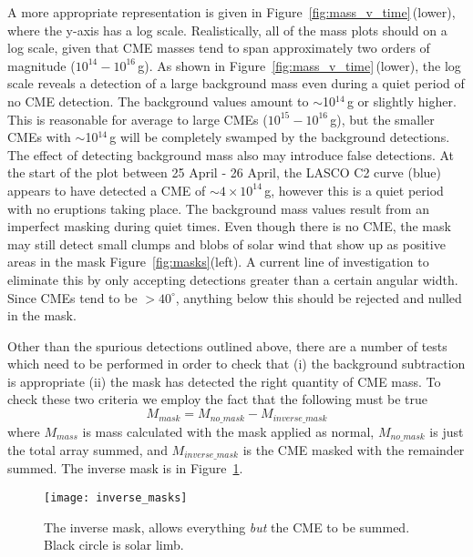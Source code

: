 A more appropriate representation is given in Figure~\ref{fig:mass_v_time}\,(lower), where the y-axis has a log scale. Realistically, all of the mass plots should on a log scale, given that CME masses tend to span approximately two orders of magnitude ($10^{14}-10^{16}$\,g). As shown in Figure~\ref{fig:mass_v_time}\,(lower), the log scale reveals a detection of a large background mass even during a quiet period of no CME detection. The background values amount to $\sim$10$^{14}$\,g or slightly higher. This is reasonable for average to large CMEs ($10^{15}-10^{16}$\,g), but the smaller CMEs with $\sim$10$^{14}$\,g will be completely swamped by the background detections. The effect of detecting background mass also may introduce false detections. At the start of the plot between 25 April - 26 April, the LASCO C2 curve (blue) appears to have detected a CME of $\sim4\times10^{14}$\,g, however this is a quiet period with no eruptions taking place. The background mass values result from an imperfect masking during quiet times. Even though there is no CME, the mask may still detect small clumps and blobs of solar wind that show up as positive areas in the mask Figure~\ref{fig:masks}(left). A current line of investigation to eliminate this by only accepting detections greater than a certain angular width. Since CMEs tend to be $>40^{\circ}$, anything below this should be rejected and nulled in the mask.
%
%

%
%
%
%

Other than the spurious detections outlined above, there are a number of tests which need to be performed in order to check that (i) the background subtraction is appropriate (ii) the mask has detected the right quantity of CME mass. 
%
To check these two criteria we employ the fact that the following must be true
\begin{equation}
M_{mask} = M_{no\_mask} - M_{inverse\_mask}
\end{equation}
where $M_{mass}$ is mass calculated with the mask applied as normal, $M_{no\_mask}$ is just the total array summed, and $M_{inverse\_mask}$ is the CME masked with the remainder summed. The inverse mask is in Figure~\ref{fig:inverse_masks}. 
\begin{figure}[t!]
\begin{center}
\texttt{[image: inverse\_masks]}
\caption{The inverse mask, allows everything \emph{but} the CME to be summed. Black circle is solar limb.}
\label{fig:inverse_masks}
\end{center}
\end{figure}

